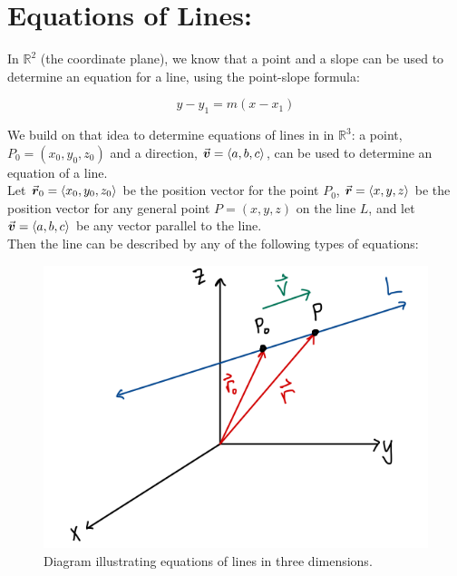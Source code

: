 \lectTitle{\vspace*{-.5in}\myTitle}{\vspace*{.1in}\mySubTitle \vspace*{-.1in}}


\setlength{\columnseprule}{0.4pt}
\setlength{\columnsep}{3em}



\section*{Equations of Lines: }

In \(\mathbb{R}^2\) (the coordinate plane), we know that a point and a slope can be used to determine an equation for a line, using the point-slope formula:

\[ y - y_1 = m (x - x_1)\]




We build on that idea to determine equations of lines in in \(\mathbb{R}^3\): a point, \(P_0 = (x_0, y_0, z_0)\) and a direction, \(\v = \<a, b, c\>\), can be used to determine an equation of a line.\\

Let \(\vec{r}_0 = \<x_0, y_0, z_0\>\) be the position vector for the point \(P_0\), \(\vec{r}  = \< x, y, z\>\) be the position vector for any general point \(P = ( x, y, z)\) on the line \(L\), and let \(\v = \<a, b, c\>\) be any vector parallel to the line.\\
  Then the line can be described by any of the following types of equations:\\



\begin{figure}[!h]
\centering
\includegraphics[width=\textwidth]{Ch10s5-lines2.png}
\caption{Diagram illustrating equations of lines in three dimensions.}
\end{figure}



